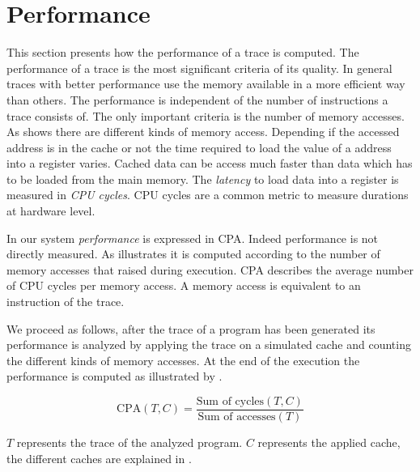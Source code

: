 \documentclass[onecolumn, openright, master, english, signatures]{dbrgrptt}
\begin{document}

\section{Performance}\label{sec:performance}

This section presents how the performance of a trace is computed.
The performance of a trace is the most significant criteria of its quality.
In general \ac{trace}s with better performance use the memory available in a more efficient way than others.
The performance is independent of the number of instructions a \ac{trace} consists of.
The only important criteria is the number of memory accesses.
As  shows there are different kinds of memory access.
Depending if the accessed address is in the cache or not the time required to load the value of a address into a register varies.
Cached data can be access much faster than data which has to be loaded from the main memory.
The \emph{latency} to load data into a register is measured in \emph{\ac{CPU} cycles}.
\ac{CPU} cycles are a common metric to measure durations at hardware level.

In our system \emph{performance} is expressed in \ac{CPA}.
Indeed performance is not directly measured.
As  illustrates it is computed according to the number of memory accesses that raised during execution.
\ac{CPA} describes the average number of \ac{CPU} cycles per memory access.
A memory access is equivalent to an instruction of the trace.

We proceed as follows, after the \ac{trace} of a program has been generated its performance is analyzed by applying the trace on a simulated cache and counting the different kinds of memory accesses.
At the end of the execution the performance is computed as illustrated by .

\begin{equation}\label{equ:performance-cpa}
\text{CPA}(T,C) = \frac{\text{Sum of cycles}(T, C)}{\text{Sum of accesses}(T)}
\end{equation}

$T$ represents the \ac{trace} of the analyzed program.
$C$ represents the applied cache, the different caches are explained in .
\end{document}
